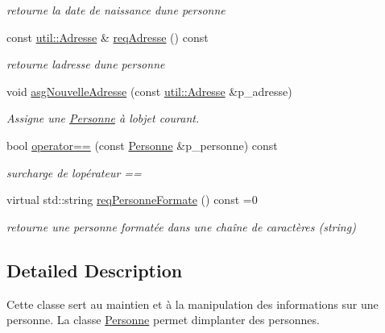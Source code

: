 \begin{DoxyCompactItemize}
\begin{DoxyCompactList}\small\item\em retourne la date de naissance d\textquotesingle{}une personne \end{DoxyCompactList}\item 
const \hyperlink{classutil_1_1Adresse}{util\+::\+Adresse} \& \hyperlink{classelections_1_1Personne_a908c8e2362d6b3bbbc6c24f8f7a4e460}{req\+Adresse} () const
\begin{DoxyCompactList}\small\item\em retourne l\textquotesingle{}adresse d\textquotesingle{}une personne \end{DoxyCompactList}\item 
void \hyperlink{classelections_1_1Personne_a1aeeb0241c9065cb43a0393f7dc1d26c}{asg\+Nouvelle\+Adresse} (const \hyperlink{classutil_1_1Adresse}{util\+::\+Adresse} \&p\+\_\+adresse)
\begin{DoxyCompactList}\small\item\em Assigne une \hyperlink{classelections_1_1Personne}{Personne} à l\textquotesingle{}objet courant. \end{DoxyCompactList}\item 
bool \hyperlink{classelections_1_1Personne_a991bb78bcf3a7ea7574d7d991c7595d9}{operator==} (const \hyperlink{classelections_1_1Personne}{Personne} \&p\+\_\+personne) const
\begin{DoxyCompactList}\small\item\em surcharge de l\textquotesingle{}opérateur == \end{DoxyCompactList}\item 
virtual std\+::string \hyperlink{classelections_1_1Personne_aac1232e61b7cb9743bafba9280041d35}{req\+Personne\+Formate} () const =0
\begin{DoxyCompactList}\small\item\em retourne une personne formatée dans une chaîne de caractères (string) \end{DoxyCompactList}\end{DoxyCompactItemize}


\subsection{Detailed Description}
Cette classe sert au maintien et à la manipulation des informations sur une personne. La classe \hyperlink{classelections_1_1Personne}{Personne} permet d\textquotesingle{}implanter des personnes. 


